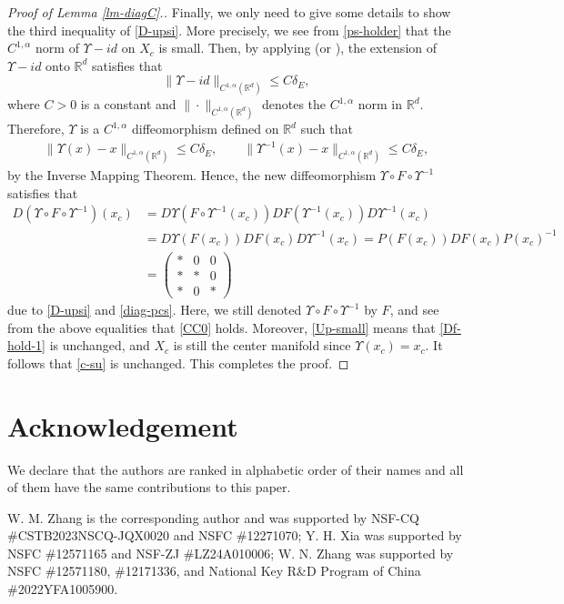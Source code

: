 \documentclass[reqno]{amsart}
\numberwithin{equation}{section}
\begin{document}
\begin{proof}[Proof of Lemma {\rm \ref{lm-diagC}}.]
Finally, we only need to give some details to show the third inequality of \eqref{D-upsi}. More precisely, 
we see from \eqref{ps-holder} that the $C^{1,\alpha}$ norm of $\Upsilon-id$ on $X_c$ is small.
Then, by applying \cite[p.177, Theorem 4]{St-Book} (or \cite[Theorem 2]{Feff-RMI}), the extension of $\Upsilon-id$ onto $\mathbb R^d$ satisfies that  
$$
\|\Upsilon-id\|_{C^{1,\alpha}(\mathbb R^d)} \le C\delta_E,
$$
where $C>0$ is a constant and $\|\cdot\|_{C^{1,\alpha}(\mathbb R^d)}$ denotes the $C^{1,\alpha}$ norm in $\mathbb R^d$. 
Therefore, $\Upsilon$ is a $C^{1,\alpha}$ diffeomorphism defined on $\mathbb R^d$ such that 
\begin{align}\label{Up-small}
\|\Upsilon(x)-x\|_{C^{1,\alpha}(\mathbb R^d)} \le C\delta_E,\quad
\quad\|\Upsilon^{-1}(x)-x\|_{C^{1,\alpha}(\mathbb R^d)} \le C\delta_E,
\end{align}
by the Inverse Mapping Theorem. Hence, the new diffeomorphism $\Upsilon\circ F \circ \Upsilon^{-1}$ satisfies that 
\begin{align*}
D(\Upsilon\circ F \circ \Upsilon^{-1})(x_c)
&=D\Upsilon(F \circ \Upsilon^{-1}(x_c))DF (\Upsilon^{-1}(x_c))D\Upsilon^{-1}(x_c)
\\
&=D\Upsilon(F(x_c))DF(x_c)D\Upsilon^{-1}(x_c)=P(F(x_c))DF(x_c)P(x_c)^{-1}
\\
&=\left(
\begin{array}{ccc}
*& 0& 0
\\
*& *&0
\\
*& 0&*
\end{array}
\right)
\end{align*}
due to \eqref{D-upsi} and \eqref{diag-pcs}. Here, we still denoted $\Upsilon\circ F \circ \Upsilon^{-1}$ by $F$, and see from the above equalities that \eqref{CC0} holds. Moreover, 
\eqref{Up-small} means that \eqref{Df-hold-1} is unchanged, and $X_c$ is still the center manifold since $\Upsilon(x_c)=x_c$. It follows that \eqref{c-su} is unchanged.
This completes the proof.     
\end{proof}

\section*{Acknowledgement}

We declare that the authors are ranked in alphabetic order of their names and all of them have the same contributions to this paper.

W. M. Zhang is the corresponding author and was supported by NSF-CQ \#CSTB2023NSCQ-JQX0020 and NSFC \#12271070; Y. H. Xia was supported by NSFC \#12571165 and NSF-ZJ \#LZ24A010006; W. N. Zhang was supported by 
NSFC \#12571180,  \#12171336, and 
National Key R\&D Program of China \#2022YFA1005900.
\end{document}
